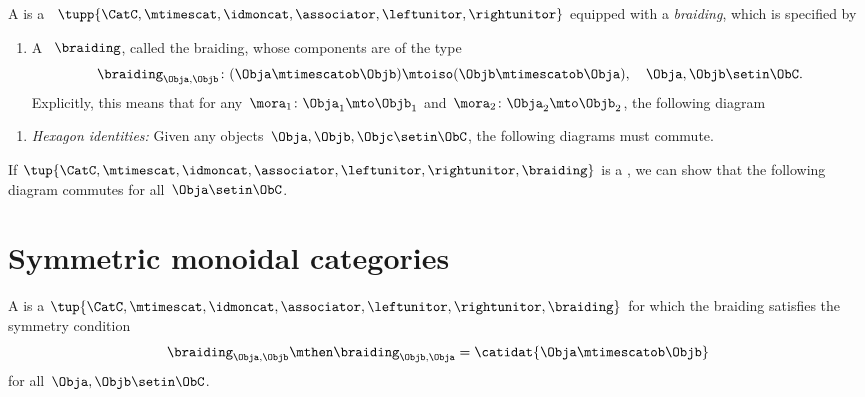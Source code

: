 

\begin{ctdefinition}
    \label{def:braided_moncat}
    A  is a ~$\tupp{\CatC,\mtimescat, \idmoncat, \associator, \leftunitor, \rightunitor}$ equipped with a \emph{braiding}, which is specified by

    \constit
    \begin{enumerate}
        \item A ~$\braiding$, called the braiding, whose components are of the type
              \begin{equation}
                  \label{eq:braiding_symmetry}
                  \braiding_{\Obja,\Objb}\colon (\Obja\mtimescatob \Objb)\mtoiso (\Objb\mtimescatob \Obja), \quad \Obja,\Objb \setin \ObC.
              \end{equation}
              Explicitly, this means that for any~$\mora_1\colon \Obja_1\mto \Objb_1$ and~$\mora_2\colon \Obja_2\mto \Objb_2$, the following diagram
    \end{enumerate}

    \condit
    \begin{enumerate}
        \item \emph{Hexagon identities:} Given any objects~$\Obja,\Objb,\Objc\setin \ObC$, the following diagrams must commute.
    \end{enumerate}
\end{ctdefinition}

\begin{remark}
    If $\tup{\CatC,{{\mtimescat}}, \idmoncat, \associator, \leftunitor, \rightunitor, \braiding}$ is a , we can show that the following diagram commutes for all~$\Obja \setin \ObC$.
\end{remark}

\section{Symmetric monoidal categories}

\begin{ctdefinition}
    \label{def:sym-mon-cat}
    A  is a  $\tup{\CatC,\mtimescat, \idmoncat, \associator, \leftunitor, \rightunitor, \braiding}$ for which the braiding satisfies the symmetry condition
    \begin{equation}
        \label{eq:braiding-symmetry}
        \braiding_{\Obja,\Objb} \mthen \braiding_{\Objb,\Obja} = \catidat{\Obja \mtimescatob \Objb}
    \end{equation}
    for all~$\Obja, \Objb \setin \ObC$.
\end{ctdefinition}

